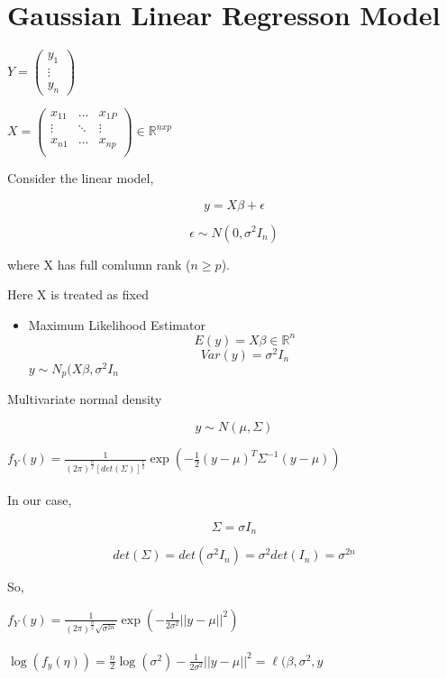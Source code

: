 \documentclass[11pt,fleqn]{book} %
\begin{document}
\section{Gaussian Linear Regresson Model}

$Y =
\begin{pmatrix} y_1  \\  
\vdots \\
y_n
 \end{pmatrix}$

$X = \begin{pmatrix}
	x_{11} & \dots & x_{1P} \\
	\vdots & \ddots & \vdots\\
	x_{n1} & \dots & x_{np}\\
\end{pmatrix} \in \mathbb{R}^{n x p}$

\vspace{5mm}

Consider the linear model, 

$$y = X\beta  + \epsilon$$

$$\epsilon \sim N(0, \sigma^2 I_n) $$

where X has full comlumn rank ($n \geq p$).

Here X is treated as fixed

\begin{itemize}
	\item Maximum Likelihood Estimator
		$$E(y) = X\beta \in \mathbb{R}^n $$
		$$Var(y) = \sigma^2 I_n $$
	$y \sim N_p(X\beta, \sigma^2 I_n$
\end{itemize}

Multivariate normal density

$$y \sim N(\mu, \Sigma) $$

$f_Y(y) = \frac{1}{(2\pi)^{\frac{n}{2}} [det(\Sigma)]^{\frac{1}{2}}} \exp(-\frac{1}{2} (y - \mu)^T \Sigma^{- 1} (y - \mu) )$\\
\\
In our case, 

$$\Sigma = \sigma I_n $$

$$det(\Sigma) = det(\sigma^2 I_n) = \sigma^2 det( I_n) = \sigma^{2n} $$

So, 

$f_Y(y) = \frac{1}{(2\pi)^{\frac{n}{2}} \sqrt{\sigma^{2n}}} \exp(-\frac{1}{2\sigma^2} ||y - \mu ||^2)$\\
\\

$\log(f_y(\eta)) = \frac{n}{2} \log(\sigma^2) -\frac{1}{2\sigma^2} ||y - \mu ||^2 = \ell(\beta, \sigma^2, y$\\
\\
\end{document}
